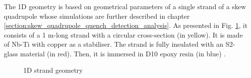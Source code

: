 
The 1D geometry is based on geometrical parameters of a single strand of a skew quadrupole whose simulations are further described in chapter \ref{section:skew_quadrupole_quench_detection_analysis}. As presented in Fig. \ref{fig: 1d_strand_geometry}, it consists of a 1 m-long strand with a circular cross-section (in yellow). It is made of Nb-Ti with copper as a stabiliser. The strand is fully insulated with an S2-glass material (in red). Then, it is immersed in D10 epoxy resin (in blue) \cite{hl_lhc_tech_design_report_v01}.

\begin{figure}[H]
    \centering
    \caption{1D strand geometry}
    \label{fig: 1d_strand_geometry}
\end{figure}




